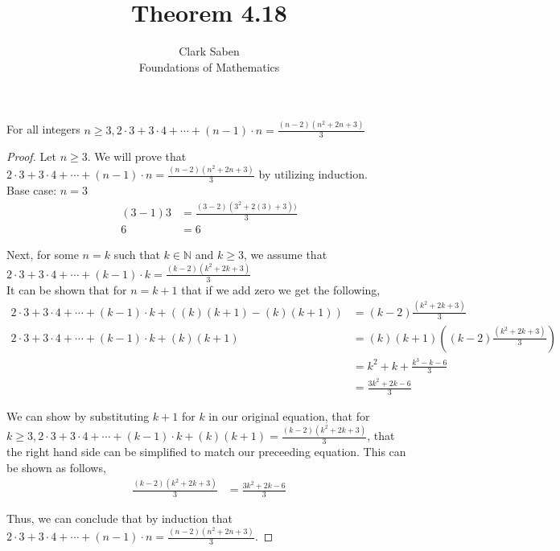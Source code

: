 \documentclass[12pt]{article}
\newenvironment{theorem}[2][Theorem]{\begin{trivlist}
\item[\hskip \labelsep {\bfseries #1}\hskip \labelsep {\bfseries #2.}]}{\end{trivlist}}
\begin{document}
 
 
\title{Theorem 4.18}%
\author{Clark Saben\\ %
Foundations of Mathematics} %
 
\maketitle

 
\begin{theorem}{4.18}
	For all integers $n \geq 3,2 \cdot 3+3 \cdot 4+\cdots+(n-1) \cdot n=\frac{(n-2)\left(n^2+2 n+3\right)}{3}$
\end{theorem}
 
\begin{proof}
	Let $n \geq 3$. We will prove that $2 \cdot 3+3 \cdot 4+\cdots+(n-1) \cdot n=\frac{(n-2)\left(n^2+2 n+3\right)}{3}$ by utilizing induction.\\

	Base case: $n=3$\\
	\begin{align*}
		{\left(3-1\right)3} &= \frac{\left(3-2 \right) \left(3^2 +2(3)+3\right))}{3}\\
			6 &= 6
	\end{align*}

	Next, for some $n=k$ such that $k \in \mathbb{N}$ and $k \geq 3$, we assume that $2 \cdot 3+3 \cdot 4+\cdots+(k-1) \cdot k=\frac{(k-2)\left(k^2+2 k+3\right)}{3}$\\
	It can be shown that for $n = k+1$ that if we add zero we get the following,
	\begin{align*}
		{2 \cdot 3+3 \cdot 4+\cdots+(k-1) \cdot k + \left((k)(k+1) - (k)(k+1) \right)} &= \left(k-2 \right) \frac{\left(k^2+2k+3 \right)}{3}\\
			2 \cdot 3+3 \cdot 4+\cdots+(k-1) \cdot k + (k)(k+1)              &= (k)(k+1) \left( \left(k-2 \right) \frac{\left(k^2+2k+3 \right)}{3} \right)\\
											 &= k^2 + k + \frac{k^3-k-6}{3}\\
											 &= \frac{3k^2 +2k-6}{3}
	\end{align*}

	We can show by substituting $k+1$ for $k$ in our original equation, that for $k \geq 3,2 \cdot 3+3 \cdot 4+\cdots+(k-1) \cdot k +(k)(k+1) =\frac{(k-2)\left(k^2+2 k+3\right)}{3}$, that 
	the right hand side can be simplified to match our preceeding equation. This can be shown as follows,
	\begin{align*}
		\frac{(k-2)\left(k^2+2 k+3\right)}{3} &= \frac{3k^2 +2k-6}{3}
	\end{align*}

	Thus, we can conclude that by induction that $2 \cdot 3+3 \cdot 4+\cdots+(n-1) \cdot n=\frac{(n-2)\left(n^2+2 n+3\right)}{3}$.



\end{proof}

    



 
 
\end{document}
